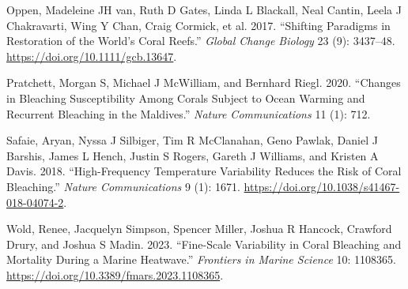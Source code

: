\documentclass[
  letterpaper,
  DIV=11,
  numbers=noendperiod]{scrartcl}
\newlength{\cslhangindent}
\newenvironment{CSLReferences}[2] %
 {\begin{list}{}{%
  \setlength{\itemindent}{0pt}
  \setlength{\leftmargin}{0pt}
  \setlength{\parsep}{0pt}
  \ifodd #1
   \setlength{\leftmargin}{\cslhangindent}
   \setlength{\itemindent}{-1\cslhangindent}
  \fi
  \setlength{\itemsep}{#2\baselineskip}}}
 {\end{list}}
\begin{document}
\begin{CSLReferences}{1}{0}
Oppen, Madeleine JH van, Ruth D Gates, Linda L Blackall, Neal Cantin,
Leela J Chakravarti, Wing Y Chan, Craig Cormick, et al. 2017.
{``Shifting Paradigms in Restoration of the World's Coral Reefs.''}
\emph{Global Change Biology} 23 (9): 3437--48.
\url{https://doi.org/10.1111/gcb.13647}.

Pratchett, Morgan S, Michael J McWilliam, and Bernhard Riegl. 2020.
{``Changes in Bleaching Susceptibility Among Corals Subject to Ocean
Warming and Recurrent Bleaching in the Maldives.''} \emph{Nature
Communications} 11 (1): 712.

Safaie, Aryan, Nyssa J Silbiger, Tim R McClanahan, Geno Pawlak, Daniel J
Barshis, James L Hench, Justin S Rogers, Gareth J Williams, and Kristen
A Davis. 2018. {``High-Frequency Temperature Variability Reduces the
Risk of Coral Bleaching.''} \emph{Nature Communications} 9 (1): 1671.
\url{https://doi.org/10.1038/s41467-018-04074-2}.

Wold, Renee, Jacquelyn Simpson, Spencer Miller, Joshua R Hancock,
Crawford Drury, and Joshua S Madin. 2023. {``Fine-Scale Variability in
Coral Bleaching and Mortality During a Marine Heatwave.''}
\emph{Frontiers in Marine Science} 10: 1108365.
\url{https://doi.org/10.3389/fmars.2023.1108365}.

\end{CSLReferences}
\end{document}
